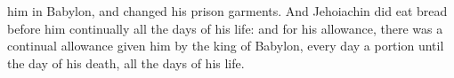 him in Babylon, and changed his prison garments. And Jehoiachin did eat bread before him continually all the days of his life: and for his allowance, there was a continual allowance given him by the king of Babylon, every day a portion until the day of his death, all the days of his life. 